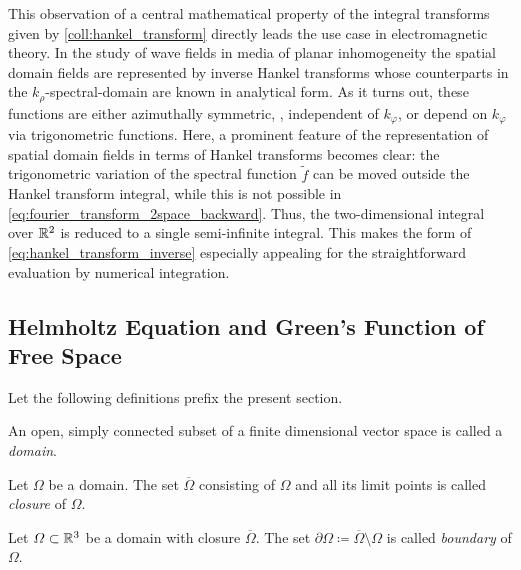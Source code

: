 This observation of a central mathematical property of the integral transforms
given by \cref{coll:hankel_transform} directly leads the use case in
electromagnetic theory.
In the study of wave fields in media of planar inhomogeneity the spatial domain
fields are represented by inverse Hankel transforms whose counterparts in the 
$k_\rho$-spectral-domain are known in analytical form.
As it turns out, these functions are either azimuthally symmetric, \ie,
independent of $k_\varphi$, or depend on $k_\varphi$ via trigonometric
functions. 
Here, a prominent feature of the representation of spatial domain fields in
terms of Hankel transforms becomes clear: the trigonometric variation of the
spectral function $\tilde{f}$
can be moved outside the Hankel transform integral, while this is not
possible in \eqref{eq:fourier_transform_2space_backward}.
Thus, the two-dimensional integral over $\mathbb{R}^2$ is reduced to a single
semi-infinite integral.
This makes the form of \eqref{eq:hankel_transform_inverse} especially appealing
for the straightforward evaluation by numerical integration.







\subsection{Helmholtz Equation and Green's Function of Free Space}

Let the following definitions prefix the present section.
\begin{definition}[Domain]
	An open, simply connected subset of a finite dimensional vector space is
	called a \emph{domain}.
\end{definition}
\begin{definition}[Closure]
	Let $\Omega$ be a domain.
	The set $\overline{\Omega}$ consisting of $\Omega$ and all its limit points
	is called \emph{closure} of $\Omega$.
\end{definition}
\begin{definition}[Boundary]
	Let $\Omega \subset \mathbb{R}^3$ be a domain with closure $\overline{\Omega}$.
	The set $\partial\Omega \coloneqq \overline{\Omega}\setminus\Omega$
	is called \emph{boundary} of $\Omega$.
\end{definition}

